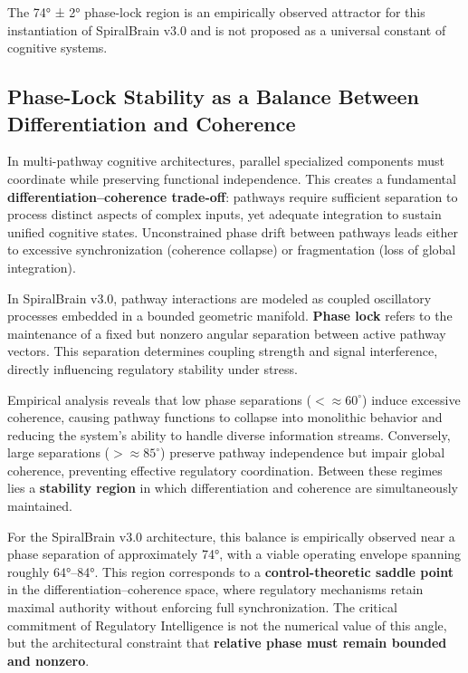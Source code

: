 \documentclass[12pt,a4paper]{report}
\begin{document}
The 74° ± 2° phase-lock region is an empirically observed attractor for this instantiation of SpiralBrain v3.0 and is not proposed as a universal constant of cognitive systems.

\subsection{Phase-Lock Stability as a Balance Between Differentiation and Coherence}

In multi-pathway cognitive architectures, parallel specialized components must coordinate while preserving functional independence. This creates a fundamental \textbf{differentiation--coherence trade-off}: pathways require sufficient separation to process distinct aspects of complex inputs, yet adequate integration to sustain unified cognitive states. Unconstrained phase drift between pathways leads either to excessive synchronization (coherence collapse) or fragmentation (loss of global integration).

In SpiralBrain v3.0, pathway interactions are modeled as coupled oscillatory processes embedded in a bounded geometric manifold. \textbf{Phase lock} refers to the maintenance of a fixed but nonzero angular separation between active pathway vectors. This separation determines coupling strength and signal interference, directly influencing regulatory stability under stress.

Empirical analysis reveals that low phase separations ($< \approx 60^\circ$) induce excessive coherence, causing pathway functions to collapse into monolithic behavior and reducing the system's ability to handle diverse information streams. Conversely, large separations ($> \approx 85^\circ$) preserve pathway independence but impair global coherence, preventing effective regulatory coordination. Between these regimes lies a \textbf{stability region} in which differentiation and coherence are simultaneously maintained.

For the SpiralBrain v3.0 architecture, this balance is empirically observed near a phase separation of approximately 74°, with a viable operating envelope spanning roughly 64°--84°. This region corresponds to a \textbf{control-theoretic saddle point} in the differentiation--coherence space, where regulatory mechanisms retain maximal authority without enforcing full synchronization. The critical commitment of Regulatory Intelligence is not the numerical value of this angle, but the architectural constraint that \textbf{relative phase must remain bounded and nonzero}.
\end{document}
